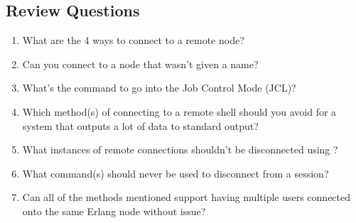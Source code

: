 \subsection*{Review Questions}

\begin{enumerate}
	\item What are the 4 ways to connect to a remote node?
	\item Can you connect to a node that wasn't given a name?
	\item What's the command to go into the Job Control Mode (JCL)?
	\item Which method(s) of connecting to a remote shell should you avoid for a system that outputs a lot of data to standard output?
	\item What instances of remote connections shouldn't be disconnected using ?
	\item What command(s) should never be used to disconnect from a session?
	\item Can all of the methods mentioned support having multiple users connected onto the same Erlang node without issue?
\end{enumerate}

